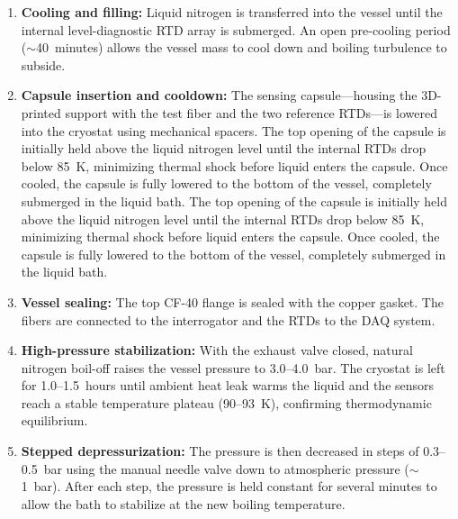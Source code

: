 \documentclass[12pt]{article}
\begin{document}
\begin{enumerate}
    \item \textbf{Cooling and filling:} Liquid nitrogen is transferred into the vessel until the internal level-diagnostic RTD array is submerged. An open pre-cooling period ($\sim$40~minutes) allows the vessel mass to cool down and boiling turbulence to subside.
    \item \textbf{Capsule insertion and cooldown:} The sensing capsule---housing the 3D-printed support with the test fiber and the two reference RTDs---is lowered into the cryostat using mechanical spacers. The top opening of the capsule is initially held above the liquid nitrogen level until the internal RTDs drop below 85~K, minimizing thermal shock before liquid enters the capsule. Once cooled, the capsule is fully lowered to the bottom of the vessel, completely submerged in the liquid bath. The top opening of the capsule is initially held above the liquid nitrogen level until the internal RTDs drop below 85~K, minimizing thermal shock before liquid enters the capsule. Once cooled, the capsule is fully lowered to the bottom of the vessel, completely submerged in the liquid bath.
    \item \textbf{Vessel sealing:} The top CF-40 flange is sealed with the copper gasket. The fibers are connected to the interrogator and the RTDs to the DAQ system.
    \item \textbf{High-pressure stabilization:} With the exhaust valve closed, natural nitrogen boil-off raises the vessel pressure to 3.0--4.0~bar. The cryostat is left for 1.0--1.5~hours until ambient heat leak warms the liquid and the sensors reach a stable temperature plateau (90--93~K), confirming thermodynamic equilibrium.
    \item \textbf{Stepped depressurization:} The pressure is then decreased in steps of 0.3--0.5~bar using the manual needle valve down to atmospheric pressure ($\sim$1~bar). After each step, the pressure is held constant for several minutes to allow the bath to stabilize at the new boiling temperature.
\end{enumerate}
\end{document}
